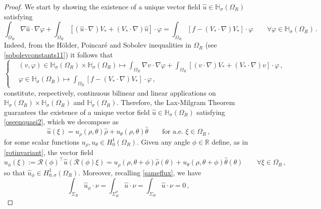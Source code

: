 \documentclass[a4paper,11pt]{article}
\numberwithin{equation}{section}
\numberwithin{figure}{section}
\begin{document}
\begin{proof}
We start by showing the existence of a unique vector field $\widehat{u} \in \mathbb{H}_{\sigma}(\Omega_{R})$ satisfying
\begin{equation}\label{oseenquasi2}
\int_{\Omega_{R}} \nabla \widehat{u} \cdot \nabla \varphi + \int_{\Omega_{R}} \left[ (\widehat{u} \cdot \nabla)V_{*} + (V_{*} \cdot \nabla)\widehat{u} \right] \cdot \varphi  = \int_{\Omega_{R}} \left[ f - (V_{*} \cdot \nabla)V_{*} \right] \cdot \varphi \qquad \forall \varphi \in \mathbb{H}_{\sigma}(\Omega_{R}) \, .
\end{equation}
Indeed, from the H\"older, Poincaré and Sobolev inequalities in $\Omega_{R}$ (see \eqref{sobolevconstants11}) it follows that
$$
\left\{
\begin{aligned}
& (v, \varphi) \in \mathbb{H}_{\sigma}(\Omega_{R}) \times \mathbb{H}_{\sigma}(\Omega_{R}) \longmapsto \int_{\Omega_{R}} \nabla v \cdot \nabla \varphi + \int_{\Omega_{R}} \left[ (v \cdot \nabla)V_{*} + (V_{*} \cdot \nabla)v \right] \cdot \varphi \, ,\\[6pt]
& \varphi \in \mathbb{H}_{\sigma}(\Omega_{R}) \longmapsto \int_{\Omega_{R}} \left[ f - (V_{*} \cdot \nabla)V_{*} \right] \cdot \varphi \, ,
\end{aligned}
\right.
$$
constitute, respectively, continuous bilinear and linear applications on $\mathbb{H}_{\sigma}(\Omega_{R}) \times \mathbb{H}_{\sigma}(\Omega_{R})$ and $\mathbb{H}_{\sigma}(\Omega_{R})$. Therefore, the Lax-Milgram Theorem guarantees the existence of a unique vector field $\widehat{u} \in \mathbb{H}_{\sigma}(\Omega_{R})$ satisfying \eqref{oseenquasi2}, which we decompose as
\begin{equation} \label{rotinvariant2hat}
\widehat{u}(\xi) = u_{\rho}(\rho, \theta) \widehat{\rho} + u_{\theta}(\rho,\theta) \widehat{\theta} \qquad \text{for a.e. }\xi \in \Omega_{R}
\, ,
\end{equation}
for some scalar functions $u_{\rho}, u_{\theta}  \in H_{0}^{1}(\Omega_{R})$. Given any angle $\phi \in \mathbb{R}$ define, as in \eqref{rotinvariant}, the vector field
\begin{equation} \label{rotinvariant2}
	\widehat{u}_{\phi}(\xi) := \mathcal{R}(\phi)^{\top} \widehat{u}(\mathcal{R}(\phi) \xi) = u_{\rho}(\rho, \theta + \phi) \widehat{\rho}(\theta) + u_{\theta}(\rho, \theta + \phi) \widehat{\theta}(\theta)  \qquad
	\forall \xi \in \Omega_{R} \, ,
\end{equation}
so that $\widehat{u}_{\phi} \in H^{1}_{0,\sigma}(\Omega_{R})$. Moreover, recalling \eqref{sameflux}, we have
$$
\int_{\Sigma_{R}} \widehat{u}_{\phi} \cdot \nu = \int_{\Sigma^{\phi}_{R}} \widehat{u} \cdot \nu = \int_{\Sigma_{R}} \widehat{u} \cdot \nu = 0 \, ,
$$
\end{proof}
\end{document}
